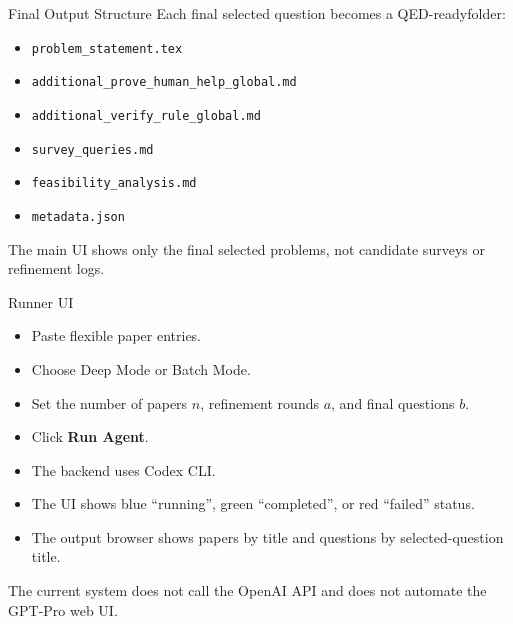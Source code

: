 \documentclass[aspectratio=169,11pt]{beamer}
\newcommand{\qedready}{QED-ready}
\begin{document}
\begin{frame}{Final Output Structure}
  Each final selected question becomes a \qedready folder:

  \begin{itemize}
    \item \texttt{problem\_statement.tex}
    \item \texttt{additional\_prove\_human\_help\_global.md}
    \item \texttt{additional\_verify\_rule\_global.md}
    \item \texttt{survey\_queries.md}
    \item \texttt{feasibility\_analysis.md}
    \item \texttt{metadata.json}
  \end{itemize}

  \vspace{0.4em}
  The main UI shows only the final selected problems, not candidate surveys or refinement logs.
\end{frame}

\begin{frame}{Runner UI}
  \begin{itemize}
    \item Paste flexible paper entries.
    \item Choose Deep Mode or Batch Mode.
    \item Set the number of papers \(n\), refinement rounds \(a\), and final questions \(b\).
    \item Click \textbf{Run Agent}.
    \item The backend uses Codex CLI.
    \item The UI shows blue ``running'', green ``completed'', or red ``failed'' status.
    \item The output browser shows papers by title and questions by selected-question title.
  \end{itemize}

  \vspace{0.4em}
  The current system does not call the OpenAI API and does not automate the GPT-Pro web UI.
\end{frame}
\end{document}
